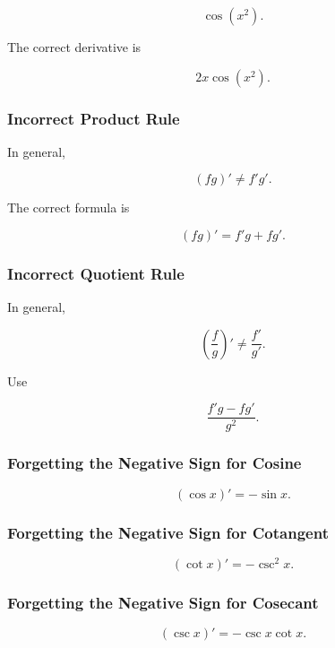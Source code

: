 \[
\cos(x^2).
\]

The correct derivative is

\[
\boxed{
2x\cos(x^2).
}
\]

\subsubsection{Incorrect Product Rule}

In general,

\[
\boxed{
(fg)'
\neq
f'g'.
}
\]

The correct formula is

\[
\boxed{
(fg)'
=
f'g+fg'.
}
\]

\subsubsection{Incorrect Quotient Rule}

In general,

\[
\boxed{
\left(
\frac fg
\right)'
\neq
\frac{f'}{g'}.
}
\]

Use

\[
\boxed{
\frac{
f'g-fg'
}{
g^2
}.
}
\]

\subsubsection{Forgetting the Negative Sign for Cosine}

\[
\boxed{
(\cos x)'
=
-\sin x.
}
\]

\subsubsection{Forgetting the Negative Sign for Cotangent}

\[
\boxed{
(\cot x)'
=
-\csc^2x.
}
\]

\subsubsection{Forgetting the Negative Sign for Cosecant}

\[
\boxed{
(\csc x)'
=
-\csc x\cot x.
}
\]


